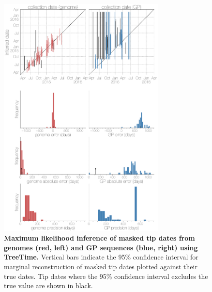 \documentclass[11pt,oneside,letterpaper]{article}
\begin{document}
\begin{figure}[h]
 \centering
	\includegraphics[width=0.75\textwidth]{supp_figures/sfig4_treetimeDates.png}
	\caption{\textbf{Maximum likelihood inference of masked tip dates from genomes (red, left) and GP sequences (blue, right) using TreeTime.}
  Vertical bars indicate the 95\% confidence interval for marginal reconstruction of masked tip dates plotted against their true dates.
  Tip dates where the 95\% confidence interval excludes the true value are shown in black.
	}
	\label{TTdates}
\end{figure}
\end{document}
